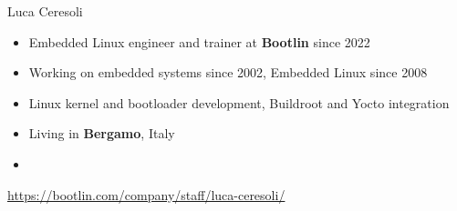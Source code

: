 \begin{frame}{Luca Ceresoli}
    \begin{itemize}
	\item Embedded Linux engineer and trainer at {\bf Bootlin}
          since 2022
        \item Working on embedded systems since 2002, Embedded Linux
          since 2008
        \item Linux kernel and bootloader development, Buildroot and
          Yocto integration
	\item Living in {\bf Bergamo}, Italy
	\item {}
    \end{itemize}
    {\small \url{https://bootlin.com/company/staff/luca-ceresoli/}}
\end{frame}
